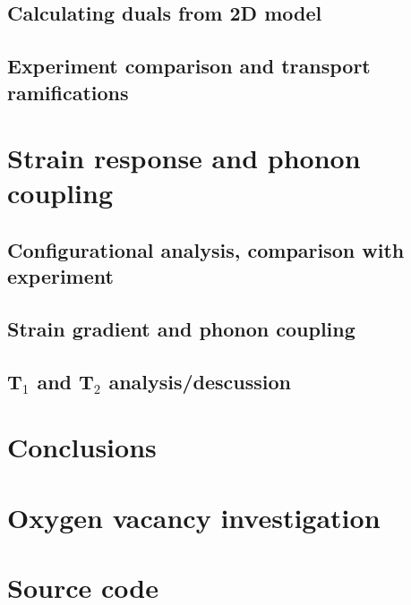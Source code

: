     \section{Calculating duals from 2D model}
    \section{Experiment comparison and transport ramifications}
    \chapter{Strain response and phonon coupling}
    \section{Configurational analysis, comparison with experiment}
    \section{Strain gradient and phonon coupling}
    \section{T$_1$ and T$_2$ analysis/descussion}
    \chapter{Conclusions}

    
    \begin{singlespace} %
    \newcommand{\maybebackrefprint}{ \backrefprint}
    \renewcommand*{\bibpreamble}{\thumb{Bibliography}}%
    
    \end{singlespace}

  
    \chapter{Oxygen vacancy investigation}
    \chapter{Source code}

  \backmatter



